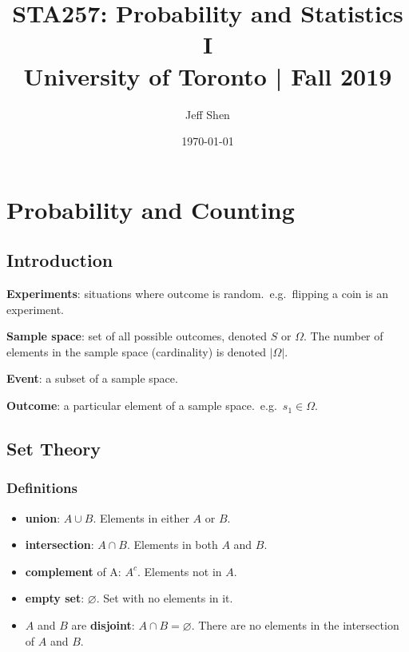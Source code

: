 \documentclass[a4paper,10pt]{article}
\begin{document}
\title{STA257: Probability and Statistics I\\
    \Large University of Toronto | Fall 2019}
\author{Jeff Shen}
\date{\today}
\maketitle
\tableofcontents



\newpage
\section{Probability and Counting}

\subsection{Introduction}

\textbf{Experiments}: situations where outcome is random.\ e.g.\ flipping a coin is an experiment.

\textbf{Sample space}: set of all possible outcomes, denoted $S$ or $\Omega$. The number of elements in the sample space (cardinality) is denoted $|\Omega|$.

\textbf{Event}: a subset of a sample space.

\textbf{Outcome}: a particular element of a sample space.\ e.g.\ $s_1 \in \Omega$.

\subsection{Set Theory}

\subsubsection{Definitions}

\begin{itemize}
    \item \textbf{union}: $A \cup B$. Elements in either $A$ or $B$.
    \item \textbf{intersection}: $A \cap B$. Elements in both $A$ and $B$. 
    \item \textbf{complement} of A: $A^c$. Elements not in $A$.
    \item \textbf{empty set}: $\varnothing$. Set with no elements in it.
    \item $A$ and $B$ are \textbf{disjoint}: $A \cap B = \varnothing$. There are no elements in the intersection of $A$ and $B$.
\end{itemize}
\end{document}
